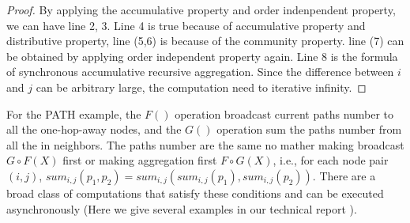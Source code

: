 \begin{proof}
	By applying the accumulative property and order indenpendent property, we can have line 2, 3. Line 4 is true because of accumulative property
	and distributive property, line (5,6) is because of the community property. line (7) can be obtained by applying order independent property again.
	Line 8 is the formula of synchronous accumulative recursive aggregation. Since the difference between $i$ and $j$ can be arbitrary large, the computation need to iterative infinity.
	\end{proof}
\begin{comment}
<<<<<<< HEAD
For the SSSP example, the $F()$ operation expands the BFS searching scope to one-hop-away nodes, and the $G()$ operation picks the minimal distance resulted from the shortest path. The shortest distances are the same no matter making expansion first $G\circ F(X)$ or making aggregation first $F\circ G(X)$, i.e., for each node $j$, $min_j(d_j+w)=min_j(min_j(d_j)+w)$. There are a broad class of computations that satisfy these conditions and can be executed asynchronously (Here we give several examples in Appendix Sec. \ref{sec:app:example}).
=======
\end{comment}
For the PATH example, the $F()$ operation broadcast current paths number to all the one-hop-away nodes, and the $G()$ operation sum the paths number from all the in neighbors. The paths number are the same no mather making broadcast $G\circ F(X)$ first or making aggregation first $F\circ G(X)$, i.e., for each node pair $(i,j)$, $sum_{i,j}(p_1,p_2)= sum_{i,j}(sum_{i,j}(p_1),sum_{i,j}(p_2))$. There are a broad class of computations that satisfy these conditions and can be executed asynchronously (Here we give several examples in our technical report \cite{fullversion}).

